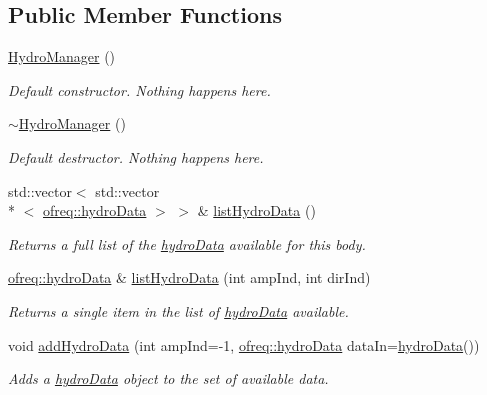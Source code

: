 \subsection*{Public Member Functions}
\begin{DoxyCompactItemize}
\item 
\hyperlink{classosea_1_1ofreq_1_1_hydro_manager_a159d6955deafd0147275ade126440605}{Hydro\-Manager} ()
\begin{DoxyCompactList}\small\item\em Default constructor. Nothing happens here. \end{DoxyCompactList}\item 
\hyperlink{classosea_1_1ofreq_1_1_hydro_manager_a995c5a32ecf0e654154fc66722f97b3b}{$\sim$\-Hydro\-Manager} ()
\begin{DoxyCompactList}\small\item\em Default destructor. Nothing happens here. \end{DoxyCompactList}\item 
std\-::vector$<$ std\-::vector\\*
$<$ \hyperlink{classosea_1_1ofreq_1_1hydro_data}{ofreq\-::hydro\-Data} $>$ $>$ \& \hyperlink{classosea_1_1ofreq_1_1_hydro_manager_a5fdd485c0d320c7e779cc490e3201f73}{list\-Hydro\-Data} ()
\begin{DoxyCompactList}\small\item\em Returns a full list of the \hyperlink{classosea_1_1ofreq_1_1hydro_data}{hydro\-Data} available for this body. \end{DoxyCompactList}\item 
\hyperlink{classosea_1_1ofreq_1_1hydro_data}{ofreq\-::hydro\-Data} \& \hyperlink{classosea_1_1ofreq_1_1_hydro_manager_a90358d92489be46f7102f577ec6f1a39}{list\-Hydro\-Data} (int amp\-Ind, int dir\-Ind)
\begin{DoxyCompactList}\small\item\em Returns a single item in the list of \hyperlink{classosea_1_1ofreq_1_1hydro_data}{hydro\-Data} available. \end{DoxyCompactList}\item 
void \hyperlink{classosea_1_1ofreq_1_1_hydro_manager_aebe5158a3b0e8d709183fc8d569c877a}{add\-Hydro\-Data} (int amp\-Ind=-\/1, \hyperlink{classosea_1_1ofreq_1_1hydro_data}{ofreq\-::hydro\-Data} data\-In=\hyperlink{classosea_1_1ofreq_1_1hydro_data}{hydro\-Data}())
\begin{DoxyCompactList}\small\item\em Adds a \hyperlink{classosea_1_1ofreq_1_1hydro_data}{hydro\-Data} object to the set of available data. \end{DoxyCompactList}\item 

\end{DoxyCompactItemize}
